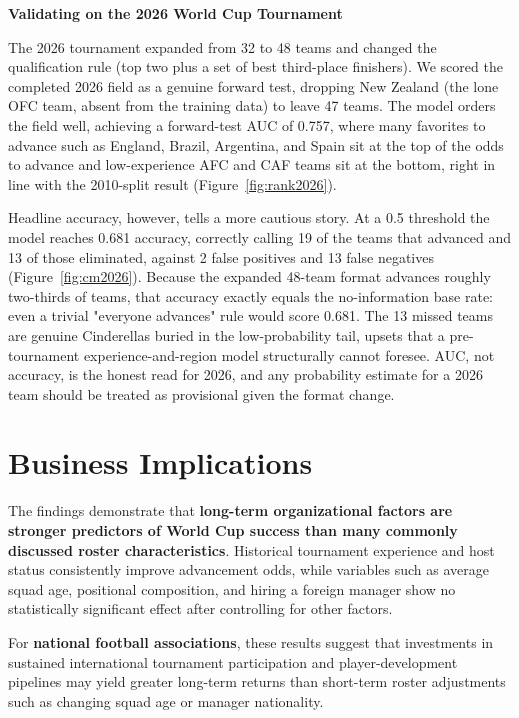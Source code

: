 \documentclass{article}
\begin{document}
\textbf{\large Validating on the 2026 World Cup Tournament}

The 2026 tournament expanded from 32 to 48 teams and changed the qualification rule (top two plus a set of best third-place finishers). We scored the completed 2026 field as a genuine forward test, dropping New Zealand (the lone OFC team, absent from the training data) to leave 47 teams. The model orders the field well, achieving a forward-test AUC of 0.757, where many favorites to advance such as England, Brazil, Argentina, and Spain sit at the top of the odds to advance and low-experience AFC and CAF teams sit at the bottom, right in line with the 2010-split result (Figure~\ref{fig:rank2026}).

Headline accuracy, however, tells a more cautious story. At a 0.5 threshold the model reaches 0.681 accuracy, correctly calling 19 of the teams that advanced and 13 of those eliminated, against 2 false positives and 13 false negatives (Figure~\ref{fig:cm2026}). Because the expanded 48-team format advances roughly two-thirds of teams, that accuracy exactly equals the no-information base rate: even a trivial "everyone advances" rule would score 0.681. The 13 missed teams are genuine Cinderellas buried in the low-probability tail, upsets that a pre-tournament experience-and-region model structurally cannot foresee. AUC, not accuracy, is the honest read for 2026, and any probability estimate for a 2026 team should be treated as provisional given the format change.


\vspace{1.8em}
\section{Business Implications}

The findings demonstrate that \textbf{long-term organizational factors are stronger predictors of World Cup success than many commonly discussed roster characteristics}. Historical tournament experience and host status consistently improve advancement odds, while variables such as average squad age, positional composition, and hiring a foreign manager show no statistically significant effect after controlling for other factors.

For \textbf{national football associations}, these results suggest that investments in sustained international tournament participation and player-development pipelines may yield greater long-term returns than short-term roster adjustments such as changing squad age or manager nationality.
\end{document}
